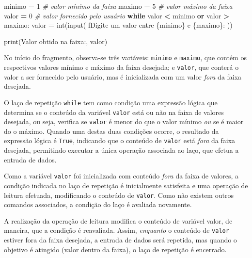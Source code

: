 \documentclass[
]{book}
\newenvironment{Shaded}{\begin{snugshade}}{\end{snugshade}}
\newcommand{\BuiltInTok}[1]{#1}
\newcommand{\CommentTok}[1]{\textcolor[rgb]{0.56,0.35,0.01}{\textit{#1}}}
\newcommand{\ControlFlowTok}[1]{\textcolor[rgb]{0.13,0.29,0.53}{\textbf{#1}}}
\newcommand{\DecValTok}[1]{\textcolor[rgb]{0.00,0.00,0.81}{#1}}
\newcommand{\KeywordTok}[1]{\textcolor[rgb]{0.13,0.29,0.53}{\textbf{#1}}}
\newcommand{\NormalTok}[1]{#1}
\newcommand{\OperatorTok}[1]{\textcolor[rgb]{0.81,0.36,0.00}{\textbf{#1}}}
\newcommand{\SpecialCharTok}[1]{\textcolor[rgb]{0.00,0.00,0.00}{#1}}
\newcommand{\SpecialStringTok}[1]{\textcolor[rgb]{0.31,0.60,0.02}{#1}}
\newcommand{\StringTok}[1]{\textcolor[rgb]{0.31,0.60,0.02}{#1}}
\begin{document}
\begin{Shaded}
\begin{Highlighting}[]
\NormalTok{minimo }\OperatorTok{=} \DecValTok{1} \CommentTok{\# valor mínimo da faixa}
\NormalTok{maximo }\OperatorTok{=} \DecValTok{5} \CommentTok{\# valor máximo da faixa}
\NormalTok{valor }\OperatorTok{=} \DecValTok{0} \CommentTok{\# valor fornecido pelo usuário}
\ControlFlowTok{while}\NormalTok{ valor }\OperatorTok{\textless{}}\NormalTok{ minimo }\KeywordTok{or}\NormalTok{ valor }\OperatorTok{\textgreater{}}\NormalTok{ maximo:}
\NormalTok{    valor }\OperatorTok{=} \BuiltInTok{int}\NormalTok{(}\BuiltInTok{input}\NormalTok{(}
        \SpecialStringTok{f\textquotesingle{}Digite um valor entre }\SpecialCharTok{\{}\NormalTok{minimo}\SpecialCharTok{\}}\SpecialStringTok{ e }\SpecialCharTok{\{}\NormalTok{maximo}\SpecialCharTok{\}}\SpecialStringTok{: \textquotesingle{}}\NormalTok{))}

\BuiltInTok{print}\NormalTok{(}\StringTok{\textquotesingle{}Valor obtido na faixa:\textquotesingle{}}\NormalTok{, valor)}
\end{Highlighting}
\end{Shaded}

No início do fragmento, observa-se três variáveis: \texttt{minimo} e \texttt{maximo}, que contém os respectivos valores mínimo e máximo da faixa desejada; e \texttt{valor}, que conterá o valor a ser fornecido pelo usuário, mas é inicializada com um valor \emph{fora} da faixa desejada.

O laço de repetição \texttt{while} tem como condição uma expressão lógica que determina se o conteúdo da variável \texttt{valor} está ou não na faixa de valores desejada, ou seja, verifica se \texttt{valor} é menor do que o valor mínimo \emph{ou} se é maior do o máximo. Quando uma destas duas condições ocorre, o resultado da expressão lógica é \texttt{True}, indicando que o conteúdo de \texttt{valor} está \emph{fora} da faixa desejada, permitindo executar a única operação associada ao laço, que efetua a entrada de dados.

Como a variável \texttt{valor} foi inicializada com conteúdo \emph{fora} da faixa de valores, a condição indicada no laço de repetição é inicialmente satisfeita e uma operação de leitura efetuada, modificando o conteúdo de \texttt{valor}. Como não existem outros comandos associados, a condição do laço é avaliada novamente.

A realização da operação de leitura modifica o conteúdo de variável valor, de maneira, que a condição é reavaliada. Assim, \emph{enquanto} o conteúdo de \texttt{valor} estiver fora da faixa desejada, a entrada de dados será repetida, mas quando o objetivo é atingido (valor dentro da faixa), o laço de repetição é encerrado.
\end{document}
